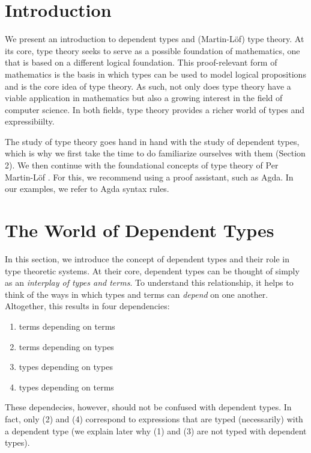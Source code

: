 \documentclass[12pt]{article}
\begin{document}
\maketitle


\section{Introduction}
We present an introduction to dependent types and (Martin-L\"of) type theory.
At its core, type theory seeks to serve as a possible foundation of mathematics,
one that is based on a different logical foundation. This proof-relevant
form of mathematics is the basis in which types can be used to model logical
propositions and is the core idea of type theory. As such, not only does type
theory have a viable application in mathematics but also a growing interest
in the field of computer science. In both fields, type theory provides a richer
world of types and expressibiilty.

The study of type theory goes hand in hand with the study of dependent types,
which is why we first take the time to do familiarize ourselves with them
(Section 2). We then continue with the foundational concepts of type theory of
Per Martin-L\"of \cite{}. For this, we recommend using a proof assistant, such
as Agda. In our examples, we refer to Agda syntax rules. 

\section{The World of Dependent Types}
In this section, we introduce the concept of dependent types and their role in
type theoretic systems. At their core, dependent types can be thought of simply
as an \textit{interplay of types and terms}. To understand this relationship,
it helps to think of the ways in which types and terms can \textit{depend} on
one another. Altogether, this results in four dependencies:

\begin{enumerate}
\item terms depending on terms
\item terms depending on types
\item types depending on types
\item types depending on terms
\end{enumerate}
These dependecies, however, should not be confused with dependent types.
In fact, only (2) and (4) correspond to expressions that are typed (necessarily)
with a dependent type (we explain later why (1) and (3) are not typed with
dependent types).
\end{document}
